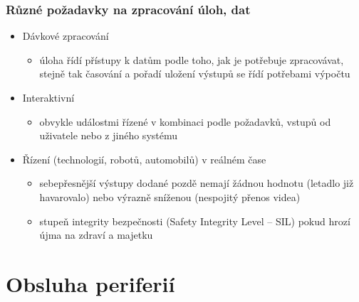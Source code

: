 \documentclass{beamer}
\begin{document}
\begin{frame}
\frametitle{Různé požadavky na zpracování úloh, dat}

\begin{itemize}
 \item Dávkové zpracování
 \begin{itemize}
  \item úloha řídí přístupy k datům podle toho, jak je potřebuje zpracovávat, stejně tak časování a pořadí uložení výstupů se řídí potřebami výpočtu
 \end{itemize}
 \item Interaktivní
 \begin{itemize}
  \item obvykle událostmi řízené v kombinaci podle požadavků, vstupů od uživatele nebo z jiného systému
 \end{itemize}
 \item Řízení (technologií, robotů, automobilů) v reálném čase
 \begin{itemize}
  \item sebepřesnější výstupy dodané pozdě nemají žádnou hodnotu (letadlo již havarovalo) nebo výrazně sníženou (nespojitý přenos videa)
  \item stupeň integrity bezpečnosti (Safety Integrity Level -- SIL) pokud hrozí újma na zdraví a majetku
 \end{itemize}

\end{itemize}
\end{frame}

\section{Obsluha periferií}
\end{document}
